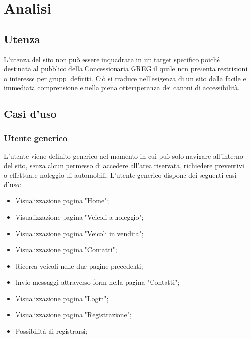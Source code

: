 \section{Analisi}

    \subsection{Utenza}
        L'utenza del sito non può essere inquadrata in un target specifico poiché destinata al pubblico della Concessionaria GREG il quale non presenta restrizioni o interesse per gruppi definiti. Ciò si traduce nell'esigenza di un sito dalla facile e immediata comprensione e nella piena ottemperanza dei canoni di accessibilità.

    \subsection{Casi d'uso}

        \subsubsection{Utente generico}
        L’utente viene definito generico nel momento in cui può solo navigare all’interno del sito, senza alcun permesso di accedere all’area riservata, richiedere preventivi o effettuare noleggio di automobili.
        L’utente generico dispone dei seguenti casi d’uso:
        \begin{itemize}
            \item Visualizzazione pagina "Home";
            \item Visualizzazione pagina "Veicoli a noleggio";
            \item Visualizzazione pagina "Veicoli in vendita";
            \item Visualizzazione pagina "Contatti";
            \item Ricerca veicoli nelle due pagine precedenti;
            \item Invio messaggi attraverso form nella pagina "Contatti";
            \item Visualizzazione pagina "Login";
            \item Visualizzazione pagina "Registrazione";
            \item Possibilità di registrarsi;
        \end{itemize}

